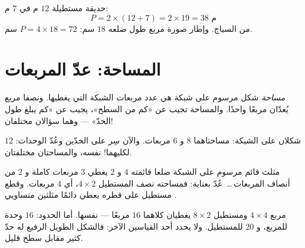 \begin{example}\label{ex:g4:measure:perimeter}
حديقة مستطيلة $12$ م في $7$ م:
\[
P = 2 \times (12 + 7) = 2 \times 19 = 38 \text{ م}
\]
من السياج. وإطار صورة مربع طول ضلعه $18$ سم:
$P = 4 \times 18 = 72$ سم.
\end{example}

\section{المساحة: عدّ المربعات}

\begin{definition}\label{def:g4:measure:area}
\emph{مساحة} شكل مرسوم على شبكة هي عدد
مربعات الشبكة التي يغطيها. ونصفا مربع يُعدّان مربعًا واحدًا.
والمساحة تجيب عن «كم من السطح»،  يجيب عن «كم يبلغ طول
الحدّ» --- وهما سؤالان مختلفان!
\end{definition}

\begin{omfigure}

{\small شكلان على الشبكة: مساحتاهما $8$ و $6$ مربعات. والآن سِر
على الحدّين وعُدّ الوحدات: $12$ لكليهما!  نفسه،
والمساحتان مختلفتان.}
\end{omfigure}

\begin{example}\label{ex:g4:measure:half}
مثلث قائم مرسوم على الشبكة ضلعا قائمته $4$ و $2$ يغطي $3$
مربعات كاملة و $2$ من أنصاف المربعات\,\dots\ عُدّ بعناية: فمساحته
نصف  المستطيل $4 \times 2$، أي $4$ مربعات. وقطع
مستطيل على قطره يعطي دائمًا مثلثين متساويي
.
\end{example}

\begin{example}\label{ex:g4:measure:samearea}
مربع $4 \times 4$ ومستطيل $8 \times 2$ يغطيان كلاهما $16$
مربعًا ---  نفسها. أما الحدود: $16$ وحدة للمربع، و $20$
للمستطيل. ولا يحدد أحد القياسين الآخر: فالشكل الطويل الرفيع
له حدّ كثير مقابل سطح قليل.
\end{example}

